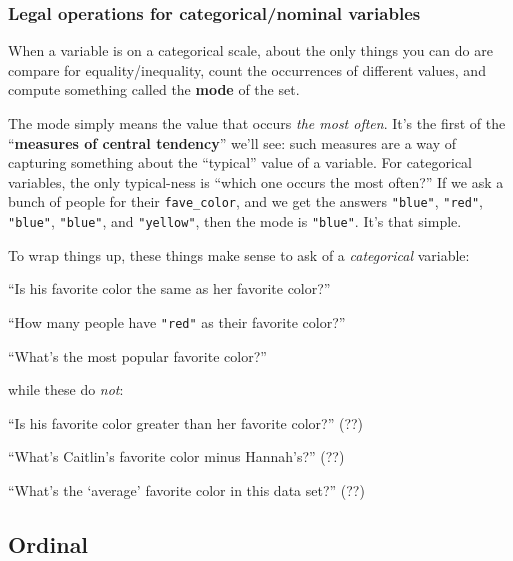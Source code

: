 \subsubsection{Legal operations for categorical/nominal variables}

When a variable is on a categorical scale, about the only things you can do are
compare for equality/inequality, count the occurrences of different values, and
compute something called the \textbf{mode} of the set.

\label{mode}
The mode simply means the value that occurs \textit{the most often}. It's the
first of the ``\textbf{measures of central tendency}'' we'll see: such measures
are a way of capturing something about the ``typical'' value of a variable. For
categorical variables, the only typical-ness is ``which one occurs the most
often?'' If we ask a bunch of people for their \texttt{fave\_color}, and we get
the answers \texttt{"blue"}, \texttt{"red"}, \texttt{"blue"}, \texttt{"blue"},
and \texttt{"yellow"}, then the mode is \texttt{"blue"}. It's that simple.

To wrap things up, these things make sense to ask of a \textit{categorical}
variable:

\begin{compactitem}
\item[\leftthumbsup] ``Is his favorite color the same as her favorite color?''
\item[\leftthumbsup] ``How many people have \texttt{"red"} as their favorite
color?''
\item[\leftthumbsup] ``What's the most popular favorite color?''
\end{compactitem}

while these do \textit{not}:

\begin{compactitem}
\item[\leftthumbsdown] ``Is his favorite color greater than her favorite
color?'' (??)
\item[\leftthumbsdown] ``What's Caitlin's favorite color minus Hannah's?'' (??)
\item[\leftthumbsdown] ``What's the `average' favorite color in this data
set?'' (??)
\end{compactitem}


\subsection{Ordinal}

